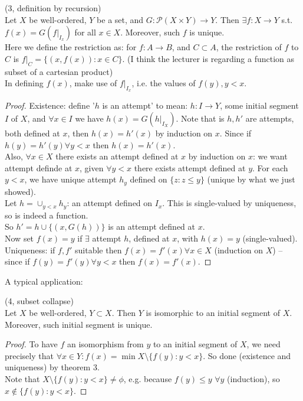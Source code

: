 \documentclass[a4paper]{article}
\begin{document}
\begin{thm} (3, definition by recursion)\\
Let $X$ be well-ordered, $Y$ be a set, and $G:\mathcal{P}(X\times Y) \to Y$. Then $\exists f : X \to Y$ s.t. $f(x) = G(f|_{I_x})$ for all $x \in X$. Moreover, such $f$ is unique.\\
Here we define the restriction as: for $f:A \to B$, and $C \subset A$, the restriction of $f$ to $C$ is $f|_C = \{(x,f(x)) : x \in C\}$. (I think the lecturer is regarding a function as subset of a cartesian product)\\
In defining $f(x)$, make use of $f|_{I_x}$, i.e. the values of $f(y), y<x$.\\
\begin{proof}
Existence: define '$h$ is an attempt' to mean: $h:I \to Y$, some initial segment $I$ of $X$, and $\forall x \in I$ we have $h(x) = G(h|_{I_X})$. Note that is $h,h'$ are attempts, both defined at $x$, then $h(x) = h'(x)$ by induction on $x$. Since if $h(y) = h'(y) \forall y < x $ then $h(x) = h'(x)$.\\
Also, $\forall x \in X$ there exists an attempt defined at $x$ by induction on $x$: we want attempt definde at $x$, given $\forall y < x$ there exists attempt defined at $y$. For each $y<x$, we have unique attempt $h_y$ defined on $\{z:z\leq y\}$ (unique by what we just showed).\\
Let $h = \cup_{y < x} h_y$: an attempt defined on $I_x$. This is single-valued by uniqueness, so is indeed a function.\\
So $h'=h \cup \{(x,G(h))\}$ is an attempt defined at $x$.\\
Now set $f(x) = y$ if $\exists$ attempt $h$, defined at $x$, with $h(x) = y$ (single-valued).\\
Uniqueness: if $f,f'$ suitable then $f(x) = f'(x) \forall x \in X$ (induction on $X$) -- since if $f(y) = f'(y) \forall y < x$ then $f(x) = f'(x)$.
\end{proof}
\end{thm}

A typical application:

\begin{prop} (4, subset collapse)\\
Let $X$ be well-ordered, $Y \subset X$. Then $Y$ is isomorphic to an initial segment of $X$. Moreover, such initial segment is unique.\\
\begin{proof}
To have $f$ an isomorphism from $y$ to an initial segment of $X$, we need precisely that $\forall x \in Y: f(x) = \min X \setminus \{f(y):y<x\}$. So done (existence and uniqueness) by theorem 3.\\
Note that $X \setminus \{f(y):y<x\} \neq \phi$, e.g. because $f(y) \leq y$ $\forall y$ (induction), so $x \not\in \{f(y):y<x\}$.
\end{proof}
\end{prop}
\end{document}
